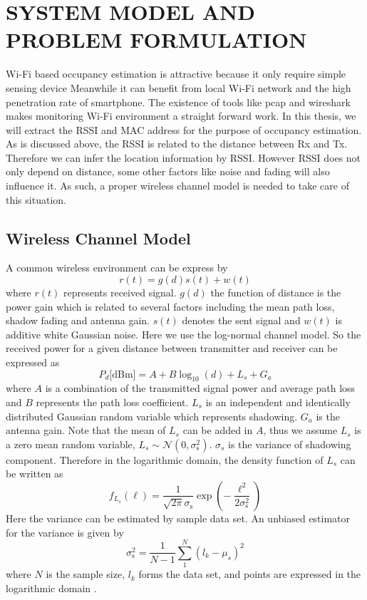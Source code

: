 \chapter{SYSTEM MODEL AND PROBLEM FORMULATION}
Wi-Fi based occupancy estimation is attractive because it only require simple sensing device Meanwhile it can benefit from local Wi-Fi network and the high penetration rate of smartphone. The existence of tools like pcap and wireshark makes monitoring Wi-Fi environment a straight forward work. In this thesis, we will extract the RSSI and MAC address for the purpose of occupancy estimation. As is discussed above, the RSSI is related to the distance between Rx and Tx. Therefore we can infer the location information by RSSI. However RSSI does not only depend on distance, some other factors like noise and fading will also influence it. As such, a proper wireless channel model is needed to take care of this situation.
\section{Wireless Channel Model} \label{section:channel}
A common wireless environment can be express by
\begin{equation*}
r (t) = g (d) s (t) + w (t)
\end{equation*}
where $r (t)$ represents received signal. $g (d)$ the function of distance is the power gain which is related to several factors including the mean path loss, shadow fading and antenna gain. $s (t)$ denotes the sent signal and $w (t)$ is additive white Gaussian noise.
Here we use the log-normal channel model. So the received power for a given distance between transmitter and receiver can be expressed as
\begin{equation} \label{channel}
P_{d} \text{[dBm]}
= A + B \log_{10}(d) + L_{s} + G_{a} 
\end{equation}
where $A$ is a combination of the transmitted signal power and average path loss
and $B$ represents the path loss coefficient.
$L_{s}$ is an independent and identically distributed Gaussian random variable which represents shadowing.
$G_{a}$ is the antenna gain. Note that the mean of $L_{s}$ can be added in $A$, thus we assume $L_{s}$ is a zero mean random variable, $L_{s}\sim\mathcal{N}(0,\sigma_{\mathrm{s}}^2)$. $\sigma_{s}$ is the variance of shadowing component. Therefore in the logarithmic domain, the density function of $L_{s}$ can be written as
\begin{equation*}
f_{L_{s}} (\ell)
= \frac{1}{\sqrt{2 \pi} \sigma_{\mathrm{s}}} 
\exp \left( - \frac{\ell^2}{2 \sigma_{\mathrm{s}}^2} \right) 
\end{equation*}
Here the variance can be estimated by sample data set. An unbiased estimator for the variance is given by~\cite{zwillinger1995crc}
\begin{equation*}
\sigma_{\mathrm{s}}^2 = \frac{1}{N-1} \sum_{1}^{N} (l_{k}-\mu_{s})^2
\end{equation*} 
where $N$ is the sample size, $l_{k}$ forms the data set, and points are expressed in the logarithmic domain \cite{kay1993fundamentals,poor1998introduction}.

